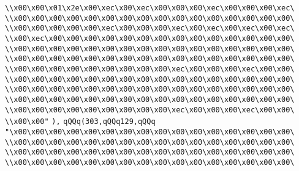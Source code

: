 \verb|\\x00\x00\x01\x2e\x00\xec\x00\xec\x00\x00\x00\xec\x00\x00\x00\xec\|\newline
\verb|\\x00\x00\x00\x00\x00\x00\x00\x00\x00\x00\x00\x00\x00\x00\x00\x00\|\newline
\verb|\\x00\x00\x00\x00\x00\xec\x00\x00\x00\xec\x00\xec\x00\xec\x00\xec\|\newline
\verb|\\x00\xec\x00\x00\x00\x00\x00\x00\x00\x00\x00\x00\x00\x00\x00\x00\|\newline
\verb|\\x00\x00\x00\x00\x00\x00\x00\x00\x00\x00\x00\x00\x00\x00\x00\x00\|\newline
\verb|\\x00\x00\x00\x00\x00\x00\x00\x00\x00\x00\x00\x00\x00\x00\x00\x00\|\newline
\verb|\\x00\x00\x00\x00\x00\x00\x00\x00\x00\xec\x00\x00\x00\xec\x00\x00\|\newline
\verb|\\x00\x00\x00\x00\x00\x00\x00\x00\x00\x00\x00\x00\x00\x00\x00\x00\|\newline
\verb|\\x00\x00\x00\x00\x00\x00\x00\x00\x00\x00\x00\x00\x00\x00\x00\x00\|\newline
\verb|\\x00\x00\x00\x00\x00\x00\x00\x00\x00\x00\x00\x00\x00\x00\x00\x00\|\newline
\verb|\\x00\x00\x00\x00\x00\x00\x00\x00\x00\xec\x00\x00\x00\xec\x00\x00\|\newline
\verb|\\x00\x00"|\newline
\verb|),|\newline
\verb|qQQq(303,qQQq129,qQQq|\newline
\verb|"\x00\x00\x00\x00\x00\x00\x00\x00\x00\x00\x00\x00\x00\x00\x00\x00\|\newline
\verb|\\x00\x00\x00\x00\x00\x00\x00\x00\x00\x00\x00\x00\x00\x00\x00\x00\|\newline
\verb|\\x00\x00\x00\x00\x00\x00\x00\x00\x00\x00\x00\x00\x00\x00\x00\x00\|\newline
\verb|\\x00\x00\x00\x00\x00\x00\x00\x00\x00\x00\x00\x00\x00\x00\x00\x00\|\newline
